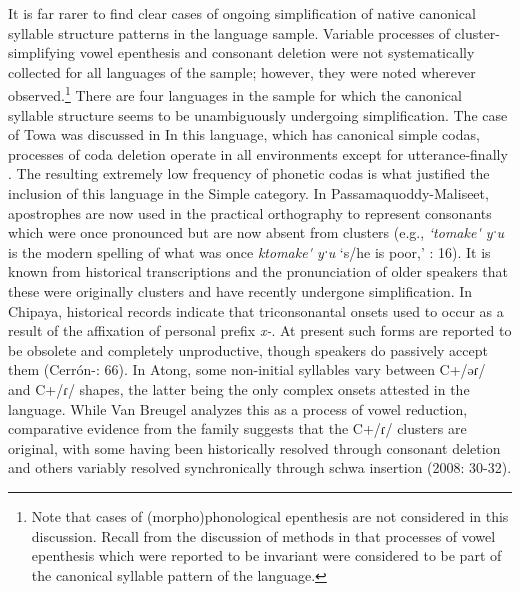   It is far rarer to find clear cases of ongoing simplification of native canonical syllable structure patterns in the language sample. Variable processes of cluster-simplifying vowel epenthesis and consonant deletion were not systematically collected for all languages of the sample; however, they were noted wherever observed.\footnote{ \textrm{Note that cases of (morpho)phonological epenthesis are not considered in this discussion. Recall from the discussion of methods in  that processes of vowel epenthesis which were reported to be invariant were considered to be part of the canonical syllable pattern of the language.}} There are four languages in the sample for which the canonical syllable structure seems to be unambiguously undergoing simplification. The case of Towa was discussed in  In this language, which has canonical simple codas, processes of coda deletion operate in all environments except for utterance-finally \citep[22-4]{Yumitani1998}. The resulting extremely low frequency of phonetic codas is what justified the inclusion of this language in the Simple category. In Passamaquoddy-Maliseet, apostrophes are now used in the practical orthography to represent consonants which were once pronounced but are now absent from clusters (e.g., \textit{‘tomake\'{} yˑu} is the modern spelling of what was once \textit{ktomake\'{} yˑu} ‘s/he is poor,’ \citealt{Leavitt1996}: 16). It is known from historical transcriptions and the pronunciation of older speakers that these were originally clusters and have recently undergone simplification. In Chipaya, historical records indicate that triconsonantal onsets used to occur as a result of the affixation of personal prefix \textit{x-}. At present such forms are reported to be obsolete and completely unproductive, though speakers do passively accept them (Cerrón-\citealt{Palomino2006}: 66). In Atong, some non-initial syllables vary between C+/əɾ/ and C+/ɾ/ shapes, the latter being the only complex onsets attested in the language. While Van Breugel analyzes this as a process of vowel reduction, comparative evidence from the family suggests that the C+/ɾ/ clusters are original, with some having been historically resolved through consonant deletion and others variably resolved synchronically through schwa insertion (2008: 30-32).

